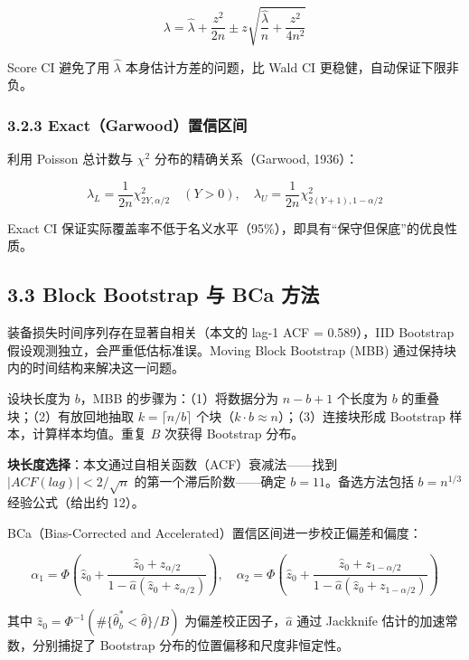 \documentclass[
  a4paper,
  fontset=none,
]{ctexart}
\begin{document}
\[
\lambda = \hat{\lambda} + \frac{z^2}{2n} \pm z\sqrt{\frac{\hat{\lambda}}{n} + \frac{z^2}{4n^2}}
\]

Score CI 避免了用 \(\hat{\lambda}\) 本身估计方差的问题，比 Wald CI
更稳健，自动保证下限非负。

\hypertarget{exactgarwoodux7f6eux4fe1ux533aux95f4}{%
\subsubsection{3.2.3
Exact（Garwood）置信区间}\label{exactgarwoodux7f6eux4fe1ux533aux95f4}}

利用 Poisson 总计数与 \(\chi^2\) 分布的精确关系（Garwood, 1936）：

\[
\lambda_L = \frac{1}{2n} \chi^2_{2Y, \alpha/2} \quad (Y > 0), \quad \lambda_U = \frac{1}{2n} \chi^2_{2(Y+1), 1-\alpha/2}
\]

Exact CI
保证实际覆盖率不低于名义水平（95\%），即具有``保守但保底''的优良性质。

\hypertarget{block-bootstrap-ux4e0e-bca-ux65b9ux6cd5}{%
\subsection{3.3 Block Bootstrap 与 BCa
方法}\label{block-bootstrap-ux4e0e-bca-ux65b9ux6cd5}}

装备损失时间序列存在显著自相关（本文的 lag-1 ACF = 0.589），IID
Bootstrap 假设观测独立，会严重低估标准误。Moving Block Bootstrap (MBB)
通过保持块内的时间结构来解决这一问题。

设块长度为 \(b\)，MBB 的步骤为：（1）将数据分为 \(n-b+1\) 个长度为
\(b\) 的重叠块；（2）有放回地抽取 \(k = \lceil n/b \rceil\)
个块（\(k \cdot b \approx n\)）；（3）连接块形成 Bootstrap
样本，计算样本均值。重复 \(B\) 次获得 Bootstrap 分布。

\textbf{块长度选择}：本文通过自相关函数（ACF）衰减法------找到
\(|ACF(lag)| < 2/\sqrt{n}\) 的第一个滞后阶数------确定
\(b=11\)。备选方法包括 \(b = n^{1/3}\) 经验公式（给出约 12）。

BCa（Bias-Corrected and Accelerated）置信区间进一步校正偏差和偏度：

\[
\alpha_1 = \Phi\left(\hat{z}_0 + \frac{\hat{z}_0 + z_{\alpha/2}}{1 - \hat{a}(\hat{z}_0 + z_{\alpha/2})}\right),\quad
\alpha_2 = \Phi\left(\hat{z}_0 + \frac{\hat{z}_0 + z_{1-\alpha/2}}{1 - \hat{a}(\hat{z}_0 + z_{1-\alpha/2})}\right)
\]

其中
\(\hat{z}_0 = \Phi^{-1}(\#\{\hat{\theta}^*_b < \hat{\theta}\} / B)\)
为偏差校正因子，\(\hat{a}\) 通过 Jackknife 估计的加速常数，分别捕捉了
Bootstrap 分布的位置偏移和尺度非恒定性。
\end{document}
